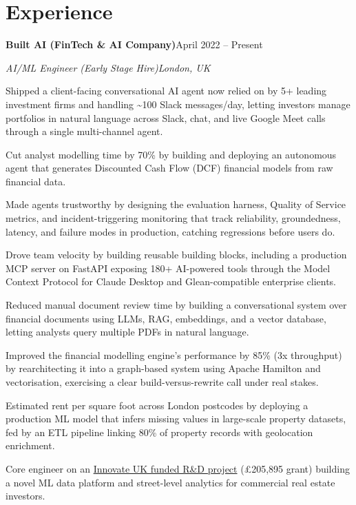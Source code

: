 \documentclass[10pt,a4paper]{article}
\newcommand{\entry}[4]{%
  {\color{company}\bfseries #1}\hfill {\color{muted}#2}\par
  \vspace{1pt}
  {\itshape #3}\hfill {\color{muted}\itshape #4}\par
  \vspace{3pt}%
}
\begin{document}
\section{Experience}
\entry{Built AI (FinTech \& AI Company)}{April 2022 -- Present}{AI/ML Engineer (Early Stage Hire)}{London, UK}
\begin{tight}
  \item Shipped a client-facing conversational AI agent now relied on by 5+ leading investment firms and handling \textasciitilde100 Slack messages/day, letting investors manage portfolios in natural language across Slack, chat, and live Google Meet calls through a single multi-channel agent.
  \item Cut analyst modelling time by 70\% by building and deploying an autonomous agent that generates Discounted Cash Flow (DCF) financial models from raw financial data.
  \item Made agents trustworthy by designing the evaluation harness, Quality of Service metrics, and incident-triggering monitoring that track reliability, groundedness, latency, and failure modes in production, catching regressions before users do.
  \item Drove team velocity by building reusable building blocks, including a production MCP server on FastAPI exposing 180+ AI-powered tools through the Model Context Protocol for Claude Desktop and Glean-compatible enterprise clients.
  \item Reduced manual document review time by building a conversational system over financial documents using LLMs, RAG, embeddings, and a vector database, letting analysts query multiple PDFs in natural language.
  \item Improved the financial modelling engine's performance by 85\% (3x throughput) by rearchitecting it into a graph-based system using Apache Hamilton and vectorisation, exercising a clear build-versus-rewrite call under real stakes.
  \item Estimated rent per square foot across London postcodes by deploying a production ML model that infers missing values in large-scale property datasets, fed by an ETL pipeline linking 80\% of property records with geolocation enrichment.
  \item Core engineer on an \href{https://gtr.ukri.org/projects?ref=10022996}{Innovate UK funded R\&D project} (\pounds205,895 grant) building a novel ML data platform and street-level analytics for commercial real estate investors.
\end{tight}
\end{document}
